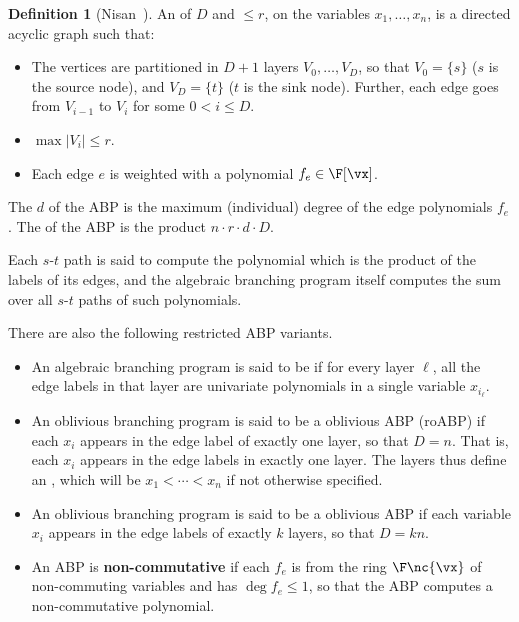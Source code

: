 \documentclass[11pt]{article}
\numberwithin{equation}{section}
\theoremstyle{definition}
\newtheorem{definition}[theorem]{Definition}
\theoremstyle{plain}
\begin{document}
\begin{definition}[Nisan~\cite{Nisan91}]\label{def:roABP}
        An  of  $D$ and  $\le r$, on the variables $x_1,\ldots,x_n$, is a directed acyclic graph such that:
        \begin{itemize}
                \item The vertices are partitioned in $D+1$ layers $V_0,\ldots,V_D$, so that $V_0=\{s\}$ ($s$ is the source node), and $V_D=\{t\}$ ($t$ is the sink node). Further, each edge goes from $V_{i-1}$ to $V_{i}$ for some $0< i\le D$.
                \item $\max|V_i|\le r$.
                \item Each edge $e$ is weighted with a polynomial $f_e\in\F[\vx]$.
        \end{itemize}
        The  $d$ of the ABP is the maximum (individual) degree of the edge polynomials $f_e$. The  of the ABP is the product $n\cdot r\cdot d\cdot D$.

        Each $s$-$t$ path is said to compute the polynomial which is the product of the labels of its edges, and the algebraic branching program itself computes the sum over all $s$-$t$ paths of such polynomials.

        There are also the following restricted ABP variants.
        \begin{itemize}
                \item An algebraic branching program is said to be  if for every layer $\ell$, all the edge labels in that layer are univariate polynomials in a single variable $x_{i_\ell}$.
                \item An oblivious branching program is said to be a  oblivious ABP (roABP) if each $x_i$ appears in the edge label of exactly one layer, so that $D=n$. That is, each $x_i$ appears in the edge labels in  exactly one layer. The layers thus define
an ,
which will be $x_1<\cdots<x_n$ if not otherwise specified.
                \item An oblivious branching program is said to be a  oblivious ABP if each variable $x_i$ appears in the edge labels of exactly $k$ layers, so that $D=kn$.
                \item An ABP is \textbf{non-commutative} if each $f_e$ is from the ring $\F\nc{\vx}$ of non-commuting variables and has $\deg f_e\le 1$, so that the ABP computes a non-commutative polynomial.
                        \qedhere
        \end{itemize}
\end{definition}
\end{document}
